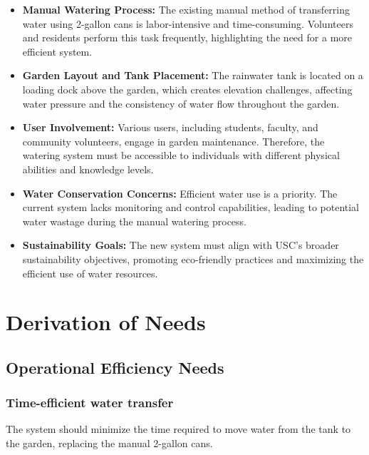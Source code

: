 \documentclass[12pt]{report}
\begin{document}
\begin{itemize}
    \item \textbf{Manual Watering Process:} The existing manual method of transferring water using 2-gallon cans is labor-intensive and time-consuming. Volunteers and residents perform this task frequently, highlighting the need for a more efficient system.
    
    \item \textbf{Garden Layout and Tank Placement:} The rainwater tank is located on a loading dock above the garden, which creates elevation challenges, affecting water pressure and the consistency of water flow throughout the garden.
    
    \item \textbf{User Involvement:} Various users, including students, faculty, and community volunteers, engage in garden maintenance. Therefore, the watering system must be accessible to individuals with different physical abilities and knowledge levels.
    
    \item \textbf{Water Conservation Concerns:} Efficient water use is a priority. The current system lacks monitoring and control capabilities, leading to potential water wastage during the manual watering process.
    
    \item \textbf{Sustainability Goals:} The new system must align with USC’s broader sustainability objectives, promoting eco-friendly practices and maximizing the efficient use of water resources.
\end{itemize}






\section{Derivation of Needs}

\subsection{Operational Efficiency Needs}

\subsubsection{Time-efficient water transfer}
The system should minimize the time required to move water from the tank to the garden, replacing the manual 2-gallon cans.
\end{document}
